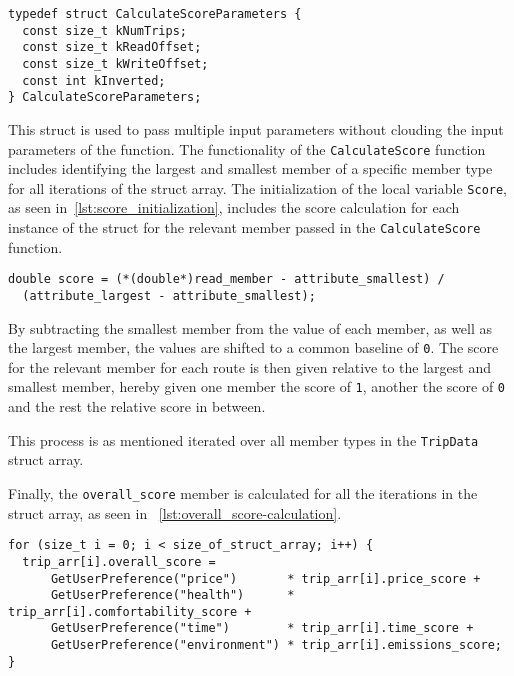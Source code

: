 \begin{lstlisting}[caption={Declaration of \texttt{CalculateScoreParameters} struct},
    label={lst:CalculateScoreParameters-declaration}]
typedef struct CalculateScoreParameters {
  const size_t kNumTrips;
  const size_t kReadOffset;
  const size_t kWriteOffset;
  const int kInverted;
} CalculateScoreParameters;
\end{lstlisting}

This struct is used to pass multiple input parameters without clouding the input parameters of the function.
The functionality of the \texttt{CalculateScore} function includes identifying the largest and smallest member of a
specific member type for all iterations of the struct array.
The initialization of the local variable \texttt{Score}, as seen in~\ref{lst:score_initialization}, includes the score
calculation for each instance of the struct for the relevant member passed in the \texttt{CalculateScore} function.

\begin{lstlisting}[caption={Initialization of \texttt{Score}}, label={lst:score_initialization}]
double score = (*(double*)read_member - attribute_smallest) /
  (attribute_largest - attribute_smallest);
\end{lstlisting}

By subtracting the smallest member from the value of each member, as well as the largest member, the values are shifted
to a common baseline of \texttt{0}.
The score for the relevant member for each route is then given relative to the largest and smallest member, hereby
given one member the score of \texttt{1}, another the score of \texttt{0} and the rest the relative score in between.

This process is as mentioned iterated over all member types in the \texttt{TripData} struct array.

Finally, the \texttt{overall\_score} member is calculated for all the iterations in the struct array, as seen in
~\ref{lst:overall_score-calculation}.

\begin{lstlisting}[caption={Calculation of \texttt{overall\_score}}, label={lst:overall_score-calculation}]
for (size_t i = 0; i < size_of_struct_array; i++) {
  trip_arr[i].overall_score =
      GetUserPreference("price")       * trip_arr[i].price_score +
      GetUserPreference("health")      * trip_arr[i].comfortability_score +
      GetUserPreference("time")        * trip_arr[i].time_score +
      GetUserPreference("environment") * trip_arr[i].emissions_score;
}
\end{lstlisting}




